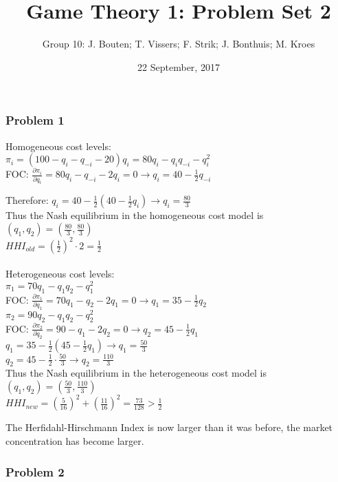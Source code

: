 \documentclass[]{article}
\author{Group 10: J. Bouten; T. Vissers; F. Strik; J. Bonthuis; M. Kroes}
\date{22 September, 2017}
\title{Game Theory 1: Problem Set 2}
\begin{document}
\maketitle

\subsubsection{Problem 1}\label{problem1}

Homogeneous cost levels:\\
$\pi_i=(100-q_i-q_{-i}-20)q_i=80q_i-q_iq_{-i}-q_i^2$\\ 
FOC: $\frac{\partial\pi_i}{\partial q_i}=80q_i-q_{-i}-2q_i=0 \rightarrow q_i=40-\frac{1}{2}q_{-i}$

Therefore: $q_i=40-\frac{1}{2}(40-\frac{1}{2}q_{i})  \rightarrow q_i=\frac{80}{3}$
\\ 
Thus the Nash equilibrium in the homogeneous cost model is $(q_1,q_2)=(\frac{80}{3},\frac{80}{3})$
\\ $HHI_{old}=\left(\frac{1}{2}\right)^2\cdot2=\frac{1}{2}$\\ \\
Heterogeneous cost levels: \\ $\pi_1=70q_1-q_1q_2-q_1^2$\\
FOC: $\frac{\partial\pi_1}{\partial q_1}=70q_1-q_2-2q_1=0 \rightarrow q_1=35-\frac{1}{2}q_2 $\\
$\pi_2=90q_2-q_1q_2-q_2^2$\\
FOC: $\frac{\partial\pi_2}{\partial q_2}=90-q_1-2q_2=0 \rightarrow q_2=45-\frac{1}{2}q_1$\\
$q_1=35-\frac{1}{2}(45-\frac{1}{2}q_1) \rightarrow q_1=\frac{50}{3}$\\
$q_2=45-\frac{1}{2}\cdot\frac{50}{3} \rightarrow q_2=\frac{110}{3}$\\
Thus the Nash equilibrium in the heterogeneous cost model is $(q_1,q_2)=(\frac{50}{3},\frac{110}{3})$\\
$HHI_{new}=\left(\frac{5}{16}\right)^2+\left(\frac{11}{16}\right)^2=\frac{73}{128}>\frac{1}{2}$

The Herfidahl-Hirschmann Index is now larger than it was before, the market concentration has become larger. 

\subsubsection{Problem 2}\label{problem2}
\end{document}
